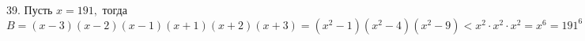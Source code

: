 39. Пусть $x=191,$ тогда $B=(x-3)(x-2)(x-1)(x+1)(x+2)(x+3)=(x^2-1)(x^2-4)(x^2-9)<x^2 \cdot x^2\cdot x^2=x^6=191^6=A.$\\
